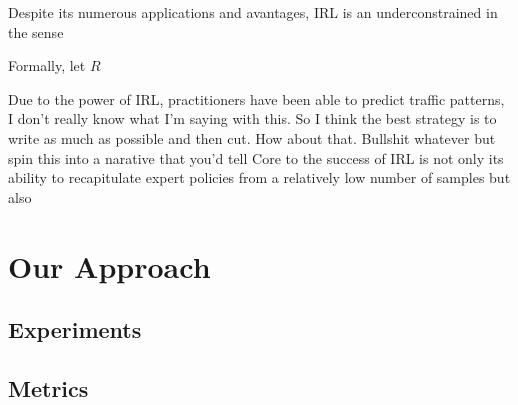 \documentclass[11pt]{article}
\begin{document}
Despite its numerous applications and avantages, IRL is an underconstrained in the sense  

Formally, let $R$

Due to the power of IRL, practitioners have been able to predict traffic patterns, I don't really know what I'm saying with this. So I think the best strategy is to write as much as possible and then cut. How about that. Bullshit whatever but spin this into a narative that you'd tell
Core to the success of IRL is not only its ability to recapitulate expert policies from a relatively low number of samples but also 






\section{Our Approach}


\todo{}


\subsection{Experiments}

\subsection{Metrics}







\end{document}
